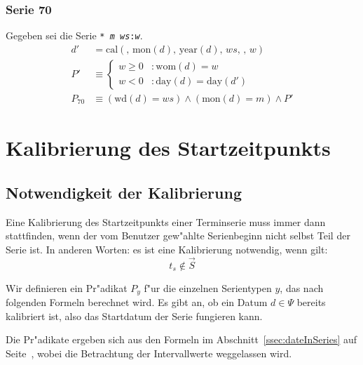 \documentclass[a4paper]{article}
\newcommand*{\dayf}{\mathrm{day}}
\newcommand*{\monf}{\mathrm{mon}}
\newcommand*{\yearf}{\mathrm{year}}
\newcommand*{\wdf}{\mathrm{wd}}
\newcommand*{\womf}{\mathrm{wom}}
\newcommand*{\calf}{\mathrm{cal}}
\numberwithin{equation}{section}
\begin{document}
\subsubsection{Serie 70}
Gegeben sei die Serie \texttt{* \textit{m} \textit{ws}:\textit{w}}.
\begin{equation}
\begin{split}
  d' & = \calf(,\,\monf(d),\,\yearf(d),\,ws,\,,\,w) \\
  P' & \equiv \left\{\begin{array}{ll}
      w \ge 0 & : \womf(d) = w \\
      w < 0 & : \dayf(d) = \dayf(d')
    \end{array}\right. \\
  P_{70} & \equiv (\wdf(d) = ws) \wedge (\monf(d) = m) \wedge P'
\end{split}
\end{equation}



%
%
%
%
\section{Kalibrierung des Startzeitpunkts}


%
%
\subsection{Notwendigkeit der Kalibrierung}
\noindent Eine Kalibrierung des Startzeitpunkts einer Terminserie muss immer
dann stattfinden, wenn der vom Benutzer gew"ahlte Serienbeginn nicht selbst Teil
der Serie ist. In anderen Worten: es ist eine Kalibrierung notwendig, wenn gilt:
\begin{equation}
  t_s \notin \vec{S}
\end{equation}

Wir definieren ein Pr"adikat $P_y$ f"ur die einzelnen Serientypen $y$, das nach
folgenden Formeln berechnet wird. Es gibt an, ob ein Datum $d \in \Psi$ bereits
kalibriert ist, also das Startdatum der Serie fungieren kann.

Die Pr"adikate ergeben sich aus den Formeln im Abschnitt~\ref{ssec:dateInSeries}
auf Seite~\pageref{ssec:dateInSeries}, wobei die Betrachtung der Intervallwerte
weggelassen wird.
\end{document}
